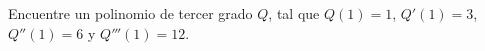 \item Encuentre un polinomio de tercer grado $Q$, tal que $Q(1) = 1$, $Q'(1) = 3$, $Q''(1) = 6$ y $Q'''(1) = 12$.
